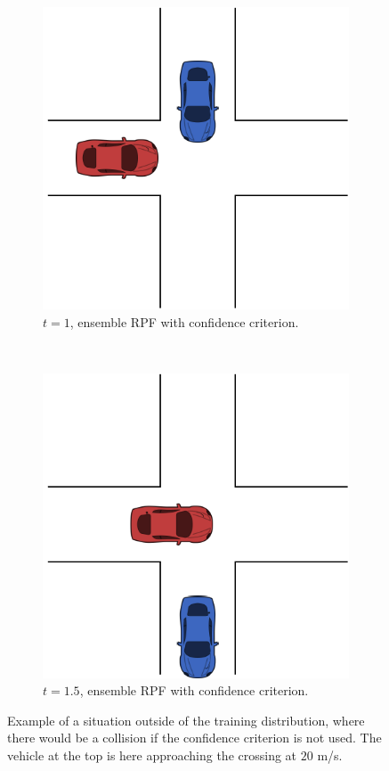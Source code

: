 \begin{figure}[!t]
	\begin{subfigure}[t]{0.48\columnwidth}
		\centering
		\includegraphics[width=0.7\columnwidth]{figures/figures-scen3.pdf}
		\caption{$t=1$, ensemble RPF with confidence criterion.}
	\end{subfigure}
	~ 
	\begin{subfigure}[t]{0.48\columnwidth}
		\centering
		\includegraphics[width=0.7\columnwidth]{figures/figures-scen4.pdf}
		\caption{$t=1.5$, ensemble RPF with confidence criterion.}
	\end{subfigure}
	\caption{Example of a situation outside of the training distribution,
	where there would be a collision if the confidence criterion is not used. The vehicle at the top is here approaching the crossing at $20$ m/s.}
	\label{fig:collisionOutsideDistribution}

\end{figure}



